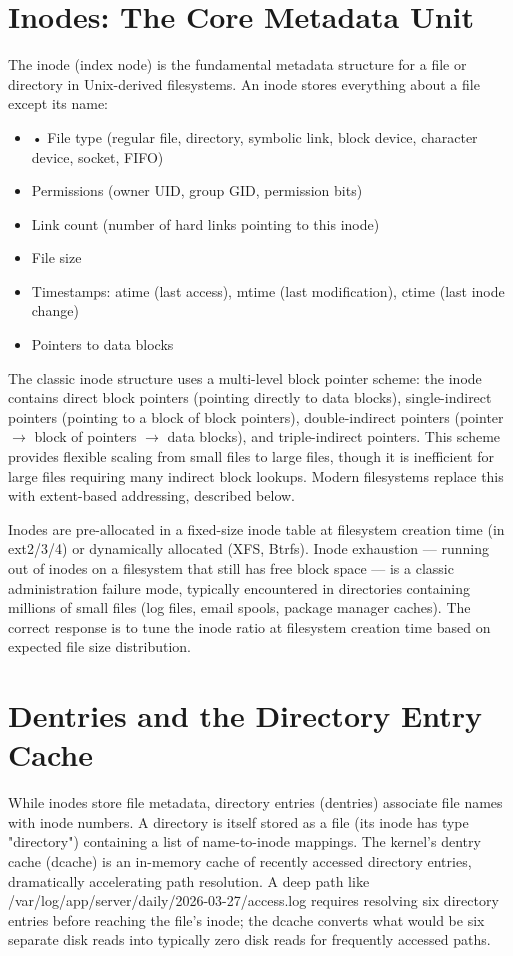 \section{Inodes: The Core Metadata Unit}
The inode (index node) is the fundamental metadata structure for a file or directory in Unix-derived filesystems. An inode stores everything about a file except its name:

\begin{itemize}
  \item • File type (regular file, directory, symbolic link, block device, character device, socket, FIFO)
  \item Permissions (owner UID, group GID, permission bits)
  \item Link count (number of hard links pointing to this inode)
  \item File size
  \item Timestamps: atime (last access), mtime (last modification), ctime (last inode change)
  \item Pointers to data blocks
\end{itemize}

The classic inode structure uses a multi-level block pointer scheme: the inode contains direct block pointers (pointing directly to data blocks), single-indirect pointers (pointing to a block of block pointers), double-indirect pointers (pointer $\rightarrow$ block of pointers $\rightarrow$ data blocks), and triple-indirect pointers. This scheme provides flexible scaling from small files to large files, though it is inefficient for large files requiring many indirect block lookups. Modern filesystems replace this with extent-based addressing, described below.

Inodes are pre-allocated in a fixed-size inode table at filesystem creation time (in ext2/3/4) or dynamically allocated (XFS, Btrfs). Inode exhaustion --- running out of inodes on a filesystem that still has free block space --- is a classic administration failure mode, typically encountered in directories containing millions of small files (log files, email spools, package manager caches). The correct response is to tune the inode ratio at filesystem creation time based on expected file size distribution.

\section{Dentries and the Directory Entry Cache}
While inodes store file metadata, directory entries (dentries) associate file names with inode numbers. A directory is itself stored as a file (its inode has type "directory") containing a list of name-to-inode mappings. The kernel's dentry cache (dcache) is an in-memory cache of recently accessed directory entries, dramatically accelerating path resolution. A deep path like /var/log/app/server/daily/2026-03-27/access.log requires resolving six directory entries before reaching the file's inode; the dcache converts what would be six separate disk reads into typically zero disk reads for frequently accessed paths.

